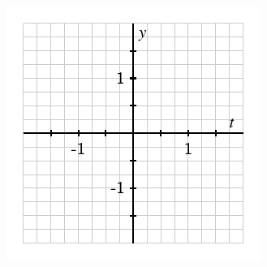 \documentclass{ximera}
\begin{document}
\begin{problem}
\includegraphics[width=1\linewidth]{inverse-trig-blank-axes-arcsin.pdf}
\end{problem}
\end{document}
